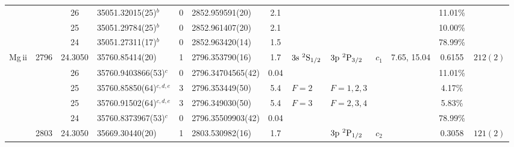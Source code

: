 \begin{table*}
\begin{center}
{\begin{tabular}{:l;l;c;l;c;l;c;l;l;c;c;c;c}
\rowstyle{\itshape}               &        & 26        & 35051.32015(25)$^{b}$            & 0 &   2852.959591(20)  &  2.1 & $                                        $ & $                                        $ & $      $ &              & 11.01\%   & $          $\\
\rowstyle{\itshape}               &        & 25        & 35051.29784(25)$^{b}$            & 0 &   2852.961407(20)  &  2.1 & $                                        $ & $                                        $ & $      $ &              & 10.00\%   & $          $\\
\rowstyle{\itshape}               &        & 24        & 35051.27311(17)$^{b}$            & 0 &   2852.963420(14)  &  1.5 & $                                        $ & $                                        $ & $      $ &              & 78.99\%   & $          $\\
                    Mg{\sc \,ii}  & 2796   & 24.3050   & 35760.85414(20)$^{}$             & 1 &   2796.353790(16)  &  1.7 & $3\rm{s}~^2\rm{S}_{1/2}                  $ & $3\rm{p}~^2\rm{P}_{3/2}                  $ & $c_{1} $ & 7.65, 15.04  & 0.6155    & $  212(2)  $\\
\rowstyle{\itshape}               &        & 26        & 35760.9403866(53)$^{c}$          & 0 & 2796.34704565(42)  & 0.04 & $                                        $ & $                                        $ & $      $ &              & 11.01\%   & $          $\\
\rowstyle{\itshape}               &        & 25        & 35760.85850(64)$^{c,d,e}$        & 3 &   2796.353449(50)  &  5.4 & $F=2                                     $ & $F=1,2,3                                 $ & $      $ &              & 4.17\%    & $          $\\
\rowstyle{\itshape}               &        & 25        & 35760.91502(64)$^{c,d,e}$        & 3 &   2796.349030(50)  &  5.4 & $F=3                                     $ & $F=2,3,4                                 $ & $      $ &              & 5.83\%    & $          $\\
\rowstyle{\itshape}               &        & 24        & 35760.8373967(53)$^{c}$          & 0 & 2796.35509903(42)  & 0.04 & $                                        $ & $                                        $ & $      $ &              & 78.99\%   & $          $\\
                                  & 2803   & 24.3050   & 35669.30440(20)$^{}$             & 1 &   2803.530982(16)  &  1.7 & $                                        $ & $3\rm{p}~^2\rm{P}_{1/2}                  $ & $c_{2} $ &              & 0.3058    & $  121(2)  $\\

\end{tabular}}
\end{center}
\end{table*}
